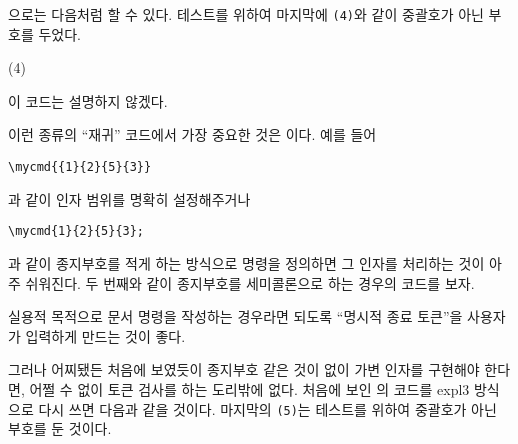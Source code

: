 \documentclass[a4paper,amsmath]{oblivoir}
\newcounter{sub}
\begin{document}
으로는 다음처럼 할 수 있다. 테스트를 위하여 마지막에 \verb|(4)|와 같이 중괄호가 아닌 부호를 두었다.
\begin{examplebelow}
\newcount\n
\def\mycmd{\futurelet\next\mycmdsub}
\def\mycmdsub{\ifx\next\bgroup\expandafter\mycmdproc\fi}
\def\mycmdproc#1{\n=1\loop\textbullet\advance\n by1\ifnum\n<#1\repeat\quad\mycmd}

\mycmd{2}{5}{3}(4)

\end{examplebelow}
이 코드는 설명하지 않겠다.

이런 종류의 “재귀” 코드에서 가장 중요한 것은 이다. 
예를 들어
\begin{verbatim}
\mycmd{{1}{2}{5}{3}}
\end{verbatim}
과 같이 인자 범위를 명확히 설정해주거나
\begin{verbatim}
\mycmd{1}{2}{5}{3};
\end{verbatim}
과 같이 종지부호를 적게 하는 방식으로 명령을 정의하면 그 인자를 처리하는 것이 아주 쉬워진다.
두 번째와 같이 종지부호를 세미콜론으로 하는 경우의 코드를 보자.

실용적 목적으로 문서 명령을 작성하는 경우라면 되도록 “명시적 종료 토큰”을 사용자가 입력하게 만드는 것이 좋다.

그러나 어찌됐든 처음에 보였듯이 종지부호 같은 것이 없이 가변 인자를 구현해야 한다면,
어쩔 수 없이 토큰 검사를 하는 도리밖에 없다.
처음에 보인 의 코드를 expl3 방식으로 다시 쓰면 다음과 같을 것이다.
마지막의 \verb|(5)|는 테스트를 위하여 중괄호가 아닌 부호를 둔 것이다.

\end{document}
